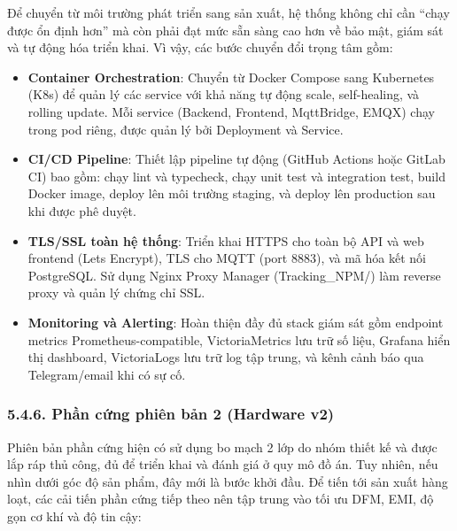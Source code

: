 \documentclass[a4paper]{extarticle}
\providecommand{\tightlist}{%
  \setlength{\itemsep}{0pt}\setlength{\parskip}{0pt}}
\begin{document}
Để chuyển từ môi trường phát triển sang sản xuất, hệ thống không chỉ cần
``chạy được ổn định hơn'' mà còn phải đạt mức sẵn sàng cao hơn về bảo
mật, giám sát và tự động hóa triển khai. Vì vậy, các bước chuyển đổi
trọng tâm gồm:

\begin{itemize}
\tightlist
\item
  \textbf{Container Orchestration}: Chuyển từ Docker Compose sang
  Kubernetes (K8s) để quản lý các service với khả năng tự động scale,
  self-healing, và rolling update. Mỗi service (Backend, Frontend,
  MqttBridge, EMQX) chạy trong pod riêng, được quản lý bởi Deployment và
  Service.
\item
  \textbf{CI/CD Pipeline}: Thiết lập pipeline tự động (GitHub Actions
  hoặc GitLab CI) bao gồm: chạy lint và typecheck, chạy unit test và
  integration test, build Docker image, deploy lên môi trường staging,
  và deploy lên production sau khi được phê duyệt.
\item
  \textbf{TLS/SSL toàn hệ thống}: Triển khai HTTPS cho toàn bộ API và
  web frontend (Let\textquotesingle s Encrypt), TLS cho MQTT (port
  8883), và mã hóa kết nối PostgreSQL. Sử dụng Nginx Proxy Manager
  (Tracking\_NPM/) làm reverse proxy và quản lý chứng chỉ SSL.
\item
  \textbf{Monitoring và Alerting}: Hoàn thiện đầy đủ stack giám sát gồm
  endpoint metrics Prometheus-compatible, VictoriaMetrics lưu trữ số
  liệu, Grafana hiển thị dashboard, VictoriaLogs lưu trữ log tập trung,
  và kênh cảnh báo qua Telegram/email khi có sự cố.
\end{itemize}

\subsubsection{5.4.6. Phần cứng phiên bản 2 (Hardware
v2)}\label{546-phux1ea7n-cux1ee9ng-phiuxean-bux1ea3n-2-hardware-v2}

Phiên bản phần cứng hiện có sử dụng bo mạch 2 lớp do nhóm thiết kế và
được lắp ráp thủ công, đủ để triển khai và đánh giá ở quy mô đồ án. Tuy
nhiên, nếu nhìn dưới góc độ sản phẩm, đây mới là bước khởi đầu. Để tiến
tới sản xuất hàng loạt, các cải tiến phần cứng tiếp theo nên tập trung
vào tối ưu DFM, EMI, độ gọn cơ khí và độ tin cậy:
\end{document}
